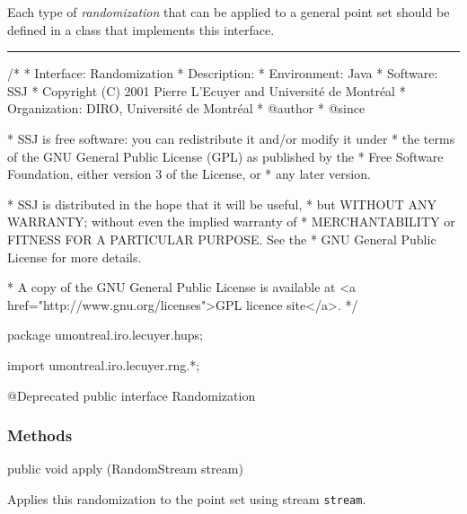 
Each type of \emph{randomization} that can be applied to a general 
point set should be defined in a class that implements this interface.


\bigskip\hrule\bigskip

\begin{code}
\begin{hide}
/*
 * Interface:    Randomization
 * Description:  
 * Environment:  Java
 * Software:     SSJ 
 * Copyright (C) 2001  Pierre L'Ecuyer and Université de Montréal
 * Organization: DIRO, Université de Montréal
 * @author       
 * @since

 * SSJ is free software: you can redistribute it and/or modify it under
 * the terms of the GNU General Public License (GPL) as published by the
 * Free Software Foundation, either version 3 of the License, or
 * any later version.

 * SSJ is distributed in the hope that it will be useful,
 * but WITHOUT ANY WARRANTY; without even the implied warranty of
 * MERCHANTABILITY or FITNESS FOR A PARTICULAR PURPOSE.  See the
 * GNU General Public License for more details.

 * A copy of the GNU General Public License is available at
   <a href="http://www.gnu.org/licenses">GPL licence site</a>.
 */
\end{hide}
package umontreal.iro.lecuyer.hups;\begin{hide}
import umontreal.iro.lecuyer.rng.*;
\end{hide}

@Deprecated
public interface Randomization \begin{hide} {
\end{hide}
\end{code}

\subsubsection* {Methods}

\begin{code}

   public void apply (RandomStream stream)\begin{hide} ;
     // public double randCoordintate(int i, int j);
}\end{hide}
\end{code}
\begin{tabb}  Applies this randomization to the point set using 
   stream \texttt{stream}.
\end{tabb}
\begin{htmlonly}
\end{htmlonly}
